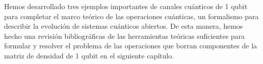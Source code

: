 Hemos desarrollado tres ejemplos importantes
de canales cuánticos de 1 qubit para completar el marco 
teórico de las operaciones cuánticas, un formalismo para describir 
la evolución de sistemas cuánticos abiertos. De esta manera, hemos 
hecho una revisión bibliográficas de las herramientas teóricas 
suficientes para formular y resolver el problema de las 
operaciones que borran componentes de la matriz de densidad de 1 qubit
en el siguiente capítulo.

%
